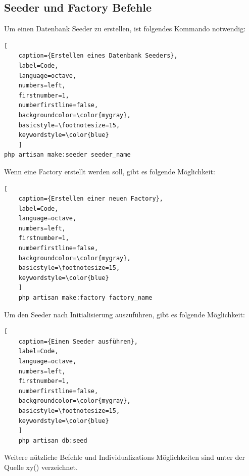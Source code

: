 \subsection{Seeder und Factory Befehle}
Um einen Datenbank Seeder zu erstellen, ist folgendes Kommando notwendig: 
\begin{lstlisting}[
	caption={Erstellen eines Datenbank Seeders},
	label=Code,
	language=octave,
	numbers=left,
	firstnumber=1,
	numberfirstline=false,
	backgroundcolor=\color{mygray},
	basicstyle=\footnotesize=15,
	keywordstyle=\color{blue}
	]
php artisan make:seeder seeder_name
\end{lstlisting}
Wenn eine Factory erstellt werden soll, gibt es folgende Möglichkeit:
\begin{lstlisting}[
	caption={Erstellen einer neuen Factory},
	label=Code,
	language=octave,
	numbers=left,
	firstnumber=1,
	numberfirstline=false,
	backgroundcolor=\color{mygray},
	basicstyle=\footnotesize=15,
	keywordstyle=\color{blue}
	]
	php artisan make:factory factory_name
\end{lstlisting}
\newpage
Um den Seeder nach Initialisierung auszuführen, gibt es folgende Möglichkeit:
\begin{lstlisting}[
	caption={Einen Seeder ausführen},
	label=Code,
	language=octave,
	numbers=left,
	firstnumber=1,
	numberfirstline=false,
	backgroundcolor=\color{mygray},
	basicstyle=\footnotesize=15,
	keywordstyle=\color{blue}
	]
	php artisan db:seed
\end{lstlisting}
Weitere nützliche Befehle und Individualizations Möglichkeiten sind unter der Quelle xy() verzeichnet.
